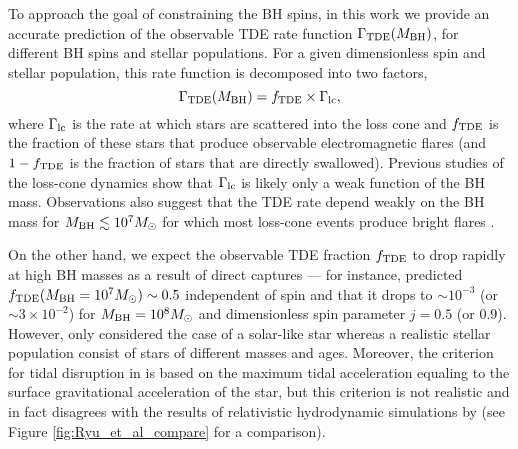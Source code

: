 \documentclass[useAMS,usenatbib]{mn2e}
\def\msun{M_{\rm \odot}}
\def\mBH{M_{\rm BH}}
\begin{document}
To approach the goal of constraining the BH spins, in this work we provide an accurate prediction of the observable TDE rate function $\Gamma_{\rm TDE}(\mBH)$, for different BH spins and stellar populations. For a given dimensionless spin and stellar population, this rate function is decomposed into two factors,
\begin{equation}
    \Gamma_{\rm TDE}(\mBH) = f_{\rm TDE}\times \Gamma_{\rm lc},
\end{equation}
where $\Gamma_{\rm lc}$ is the rate at which stars are scattered into the loss cone and $f_{\rm TDE}$ is the fraction of these stars that produce observable electromagnetic flares (and $1-f_{\rm TDE}$ is the fraction of stars that are directly swallowed). Previous studies of the loss-cone dynamics \citep{magorrian99_TDE_rate, wang04_TDE_rate, stone16_TDE_rate, stone20_TDE_rate_review} show that $\Gamma_{\rm lc}$ is likely only a weak function of the BH mass.
Observations also suggest that the TDE rate depend weakly on the BH mass for $\mBH\lesssim 10^7\msun$ for which most loss-cone events produce bright flares \citep[][their Figure 3]{vanvelzen18_TDE_rate_suppression}.

On the other hand, we expect the observable TDE fraction $f_{\rm TDE}$ to drop rapidly at high BH masses as a result of direct captures --- for instance, \citet{Kesden2012} predicted $f_{\rm TDE}(\mBH=10^7\msun)\sim 0.5$ independent of spin and that it drops to $\sim\! 10^{-3}$ (or $\sim \!3\times10^{-2}$) for $\mBH=10^8\msun$ and dimensionless spin parameter $j=0.5$ (or $0.9$). However, \citet{Kesden2012} only considered the case of a solar-like star whereas a realistic stellar population consist of stars of different masses and ages. Moreover, the criterion for tidal disruption in \citet{Kesden2012} is based on the maximum tidal acceleration equaling to the surface gravitational acceleration of the star, but this criterion is not realistic and in fact disagrees with the results of relativistic hydrodynamic simulations by \citet{Ryu2020d} (see Figure \ref{fig:Ryu_et_al_compare} for a comparison).
\end{document}
